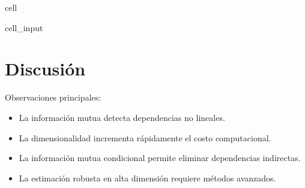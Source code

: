 \documentclass[letterpaper,10pt,english]{jupyterBook}
\begin{document}
\begin{sphinxuseclass}{cell}\begin{sphinxVerbatimInput}

\begin{sphinxuseclass}{cell_input}
\begin{sphinxVerbatim}[commandchars=\\\{\}]
  


\end{sphinxVerbatim}

\end{sphinxuseclass}\end{sphinxVerbatimInput}

\end{sphinxuseclass}

\section{Discusión}
\label{\detokenize{03_multivariate_models/high_dimensional:discusion}}
\sphinxAtStartPar
Observaciones principales:
\begin{itemize}
\item {} 
\sphinxAtStartPar
La información mutua detecta dependencias no lineales.

\item {} 
\sphinxAtStartPar
La dimensionalidad incrementa rápidamente el costo computacional.

\item {} 
\sphinxAtStartPar
La información mutua condicional permite eliminar dependencias indirectas.

\item {} 
\sphinxAtStartPar
La estimación robusta en alta dimensión requiere métodos avanzados.

\end{itemize}
\end{document}
